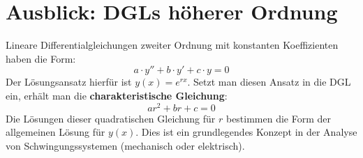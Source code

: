 \section{Ausblick: DGLs höherer Ordnung}
Lineare Differentialgleichungen zweiter Ordnung mit konstanten Koeffizienten haben die Form:
\[ a\cdot y'' + b\cdot y' + c\cdot y = 0 \]
Der Lösungsansatz hierfür ist $y(x) = e^{rx}$. Setzt man diesen Ansatz in die DGL ein, erhält man die \textbf{charakteristische Gleichung}:
\[ ar^2 + br + c = 0 \]
Die Lösungen dieser quadratischen Gleichung für $r$ bestimmen die Form der allgemeinen Lösung für $y(x)$. Dies ist ein grundlegendes Konzept in der Analyse von Schwingungssystemen (mechanisch oder elektrisch).

\newpage